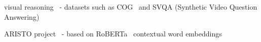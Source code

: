%
%


%
%
%
%
%
%
%
%

visual reasoning~\cite{mogadala2019trends} - datasets such as COG~\cite{yang2018dataset} and 
SVQA (Synthetic Video Question Answering)~\cite{song2018explore}


ARISTO project~\cite{clark2019f} - based on RoBERTa~\cite{liu2019roberta} contextual word embeddings

